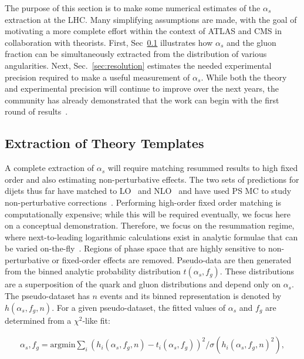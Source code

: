 
The purpose of this section is to make some numerical estimates of the $\alpha_s$ extraction at the LHC.  Many simplifying assumptions are made, with the goal of motivating a more complete effort within the context of ATLAS and CMS in collaboration with theorists.   First, Sec~\ref{sec:templates} illustrates how $\alpha_s$ and the gluon fraction can be simultaneously extracted from the distribution of various angularities.  Next, Sec.~\ref{sec:resolution} estimates the needed experimental precision required to make a useful measurement of $\alpha_s$.   While both the theory and experimental precision will continue to improve over the next years, the community has already demonstrated that the work can begin with the first round of results~\cite{Aaboud:2017qwh,CMS-PAS-SMP-16-010,Frye:2016aiz,Frye:2016okc,Marzani:2017mva,Marzani:2017kqd}.

\subsection{Extraction of Theory Templates}
\label{sec:templates}

A complete extraction of $\alpha_s$ will require matching resummed results to high fixed order and also estimating non-perturbative effects.  The two sets of predictions for dijets thus far have matched to LO~\cite{Frye:2016aiz,Frye:2016okc} and NLO~\cite{Marzani:2017mva,Marzani:2017kqd} and have used PS MC to study non-perturbative corrections~\cite{Marzani:2017mva,Marzani:2017kqd}.  Performing high-order fixed order matching is computationally expensive; while this will be required eventually, we focus here on a conceptual demonstration.  Therefore, we focus on the resummation regime, where next-to-leading logarithmic calculations exist in analytic formulae that can be varied on-the-fly~\cite{Marzani:2017mva,Marzani:2017kqd}.  Regions of phase space that are highly sensitive to non-perturbative or fixed-order effects are removed.  Pseudo-data are then generated from the binned analytic probability distribution $t(\alpha_s,f_g)$.  These distributions are a superposition of the quark and gluon distributions and depend only on $\alpha_s$.  The pseudo-dataset has $n$ events and its binned representation is denoted by  $h(\alpha_s,f_g,n)$.  For a given pseudo-dataset, the fitted values of $\alpha_s$ and $f_g$ are determined from a $\chi^2$-like fit:

\begin{align}
\label{eq:chi2fit}
\alpha_s,f_g=\text{argmin} \sum_i (h_i(\alpha_s,f_g,n)-t_i(\alpha_s,f_g))^2/\sigma(h_i(\alpha_s,f_g,n)^2),
\end{align}

